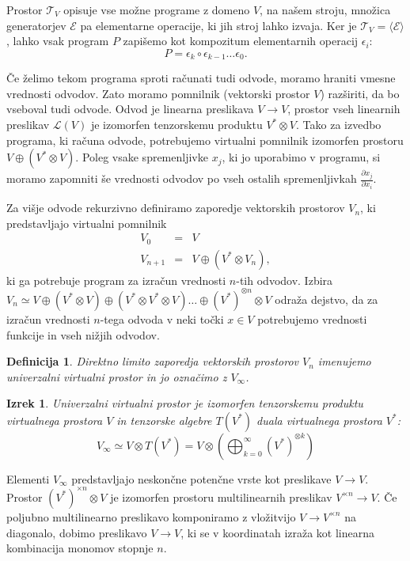 \documentclass{article}
\newcommand{\E}{\mathcal{E}}
\newcommand{\T}{\mathcal{T}}
\newtheorem{definicija}{Definicija}[section]
\newtheorem{izrek}{Izrek}[section]
\begin{document}
Prostor $\T_V$ opisuje vse možne programe z domeno $V$, na našem
stroju, množica generatorjev $\E$ pa elementarne operacije, ki jih stroj lahko
izvaja. Ker je $\T_V=\langle \E \rangle$, lahko vsak program $P$ zapišemo kot
kompozitum elementarnih operacij $\epsilon_i$:
\[
P = \epsilon_k\circ\epsilon_{k-1}\ldots\epsilon_0.
\]  

Če želimo tekom programa sproti računati tudi odvode, moramo hraniti vmesne
vrednosti odvodov. Zato moramo pomnilnik (vektorski prostor $V$) razširiti, da
bo vseboval tudi odvode. Odvod je linearna preslikava $V\to V$, prostor
vseh linearnih preslikav $\mathcal{L}(V)$ je izomorfen tenzorskemu produktu
$V^*\otimes V$. Tako za izvedbo programa, ki računa odvode, potrebujemo virtualni
pomnilnik izomorfen prostoru $V\oplus (V^*\otimes V)$. Poleg vsake spremenljivke $x_j$, ki
jo uporabimo v programu, si moramo zapomniti še vrednosti odvodov po vseh
ostalih spremenljivkah $\frac{\partial x_j}{\partial x_i}$.   

Za višje odvode rekurzivno definiramo zaporedje vektorskih prostorov $V_n$, ki
predstavljajo virtualni pomnilnik
\begin{eqnarray}\label{eq:V_n}
  \label{eq:prapor}
  V_0 &=& V\\
  V_{n+1}&=&V\oplus (V^*\otimes V_n),
\end{eqnarray} 
ki ga potrebuje program za izračun vrednosti $n$-tih odvodov. Izbira $V_n\simeq
V\oplus (V^*\otimes V) \oplus (V^*\otimes V^*\otimes V) \ldots \oplus
(V^*)^{\otimes n}\otimes V$ odraža dejstvo, da za izračun vrednosti $n$-tega odvoda v neki točki $x\in V$
potrebujemo vrednosti funkcije in vseh nižjih odvodov.
\begin{definicija}
  Direktno limito zaporedja vektorskih prostorov $V_n$ imenujemo
  \emph{univerzalni virtualni prostor} in jo označimo z $V_\infty$.
\end{definicija}
\begin{izrek}
  Univerzalni virtualni prostor je izomorfen tenzorskemu produktu virtualnega
  prostora $V$ in tenzorske algebre $T(V^*)$ duala virtualnega prostora $V^*$:
  \begin{equation}
\label{eq:tenzor_algebra}
    V_\infty\simeq V\otimes T(V^*) = V \otimes\left(\bigoplus_{k=0}^\infty (V^*)^{\otimes k} \right)
\end{equation}

\end{izrek}

Elementi $V_\infty$ predstavljajo neskončne potenčne vrste kot preslikave 
$V\to V$. Prostor $(V^*)^{\times n}\otimes V$ je izomorfen prostoru
multilinearnih preslikav $V^{\times n}\to V$. Če poljubno
multilinearno preslikavo komponiramo z vložitvijo $V\to V^{\times n}$ na
diagonalo, dobimo preslikavo $V\to V$, ki se v koordinatah izraža kot linearna
kombinacija monomov stopnje $n$.
\end{document}
